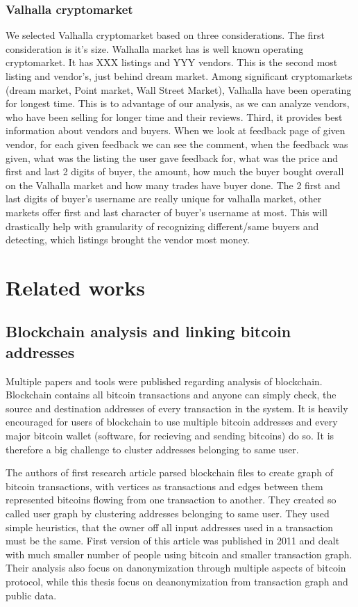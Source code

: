 \documentclass[
  digital, %
  table,   %
  lof,     %
  lot,     %
  oneside
]{fithesis3}
\begin{document}
\subsection{Valhalla cryptomarket}

We selected Valhalla cryptomarket based on three considerations.
The first consideration is it's size. Walhalla market has is well known operating cryptomarket. It has XXX listings and YYY vendors.
This is the second most listing and vendor's, just behind dream market.
Among significant cryptomarkets (dream market, Point market, Wall Street Market), Valhalla
have been operating for longest time. This is to advantage of our analysis, as we can 
analyze vendors, who have been selling for longer time and their reviews.
Third, it provides best information about vendors and buyers.
When we look at feedback page of given vendor, for each given feedback we can see the comment, when the feedback was given,
what was the listing the user gave feedback for, what was the price and first and last 2 digits of buyer,
the amount, how much the buyer bought overall on the Valhalla market and how many trades have buyer done.
The 2 first and last digits of buyer's username are really unique for valhalla market,
other markets offer first and last character of buyer's username at most.
This will drastically help with granularity of recognizing different/same buyers and detecting,
which listings brought the vendor most money.


\chapter{Related works}
\section{Blockchain analysis and linking bitcoin addresses}

Multiple papers and tools were published regarding analysis of blockchain.
Blockchain contains all bitcoin transactions and anyone can simply check,
the source and destination addresses of every transaction in the system.
It is heavily encouraged for users of blockchain to use multiple bitcoin addresses
 and every major bitcoin wallet (software, for recieving and sending bitcoins) do so.
 It is therefore a big challenge to cluster addresses belonging to same user.
 
The authors of first research article \parencite{reid2013analysis}
 parsed blockchain files to create graph of bitcoin transactions, with vertices as transactions
 and edges between them represented bitcoins flowing from one transaction to another.
 They created so called user graph by clustering addresses belonging to same user.
 They used simple heuristics, that the owner off all input addresses used
 in a transaction must be the same. First version of this article  
was published in 2011 and dealt with much smaller number of people using bitcoin and smaller transaction graph.
Their analysis also focus on danonymization through multiple aspects of bitcoin protocol,
while this thesis focus on deanonymization from transaction graph and public data.
\end{document}
